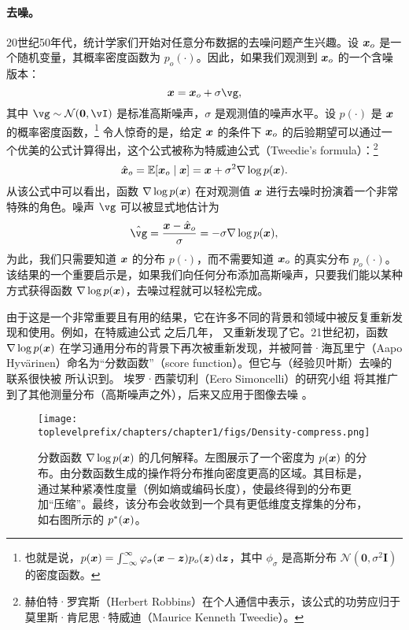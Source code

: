 \documentclass[../../book-main.tex]{subfiles}
\begin{document}
\paragraph{去噪。}
20世纪50年代，统计学家们开始对任意分布数据的去噪问题产生兴趣。设 $\bm{x}_o$ 是一个随机变量，其概率密度函数为 $p_o(\cdot)$。因此，如果我们观测到 $\bm{x}_o$ 的一个含噪版本：
\begin{equation}
    \x = \x_o + \sigma \vg, 
\end{equation}
其中 $\vg \sim \dNorm(\vzero, \vI)$ 是标准高斯噪声，$\sigma$ 是观测值的噪声水平。设 $p(\cdot)$ 是 $\bm{x}$ 的概率密度函数，\footnote{也就是说，$p(\x) = \int_{-\infty}^{\infty} \phi_{\sigma}(\x - \z)p_o(\z) \odif{\z}$，其中 $\phi_{\sigma}$ 是高斯分布 $\mathcal{N}(\boldsymbol{0}, \sigma^2 \boldsymbol{I})$ 的密度函数。} 令人惊奇的是，给定 $\bm{x}$ 的条件下 $\bm{x}_o$ 的后验期望可以通过一个优美的公式计算得出，这个公式被称为特威迪公式（Tweedie's formula）\cite{Robbins1956AnEB}：\footnote{赫伯特·罗宾斯（Herbert Robbins）在个人通信中表示，该公式的功劳应归于莫里斯·肯尼思·特威迪（Maurice Kenneth Tweedie）。}
\begin{equation}
    \hat {\bm{x}}_o = \mathbb{E}[\bm{x}_o\mid \bm{x}] = \bm{x} + \sigma^2 \nabla \log p(\bm{x}).
\end{equation}
从该公式中可以看出，函数 $\nabla \log p(\bm{x})$ 在对观测值 $\bm{x}$ 进行去噪时扮演着一个非常特殊的角色。噪声 $\vg$ 可以被显式地估计为
\begin{equation}
    \hat{\vg} = \frac{\x - \hat \x_o}{\sigma} = -\sigma \nabla \log p(\x),
\end{equation}
为此，我们只需要知道 $\bm{x}$ 的分布 $p(\cdot)$，而不需要知道 $\bm{x}_o$ 的真实分布 $p_o(\cdot)$。该结果的一个重要启示是，如果我们向任何分布添加高斯噪声，只要我们能以某种方式获得函数 $\nabla \log p(\bm{x})$，去噪过程就可以轻松完成。

由于这是一个非常重要且有用的结果，它在许多不同的背景和领域中被反复重新发现和使用。例如，在特威迪公式 \cite{Robbins1956AnEB} 之后几年，\cite{Miyasawa61} 又重新发现了它。21世纪初，函数 $\nabla \log p(\bm{x})$ 在学习通用分布的背景下再次被重新发现，并被阿普·海瓦里宁（Aapo Hyv\"{a}rinen）命名为“分数函数”（score function）\cite{hyvarinen05a}。但它与（经验贝叶斯）去噪的联系很快被 \cite{Vincent2011} 所认识到。
埃罗·西蒙切利（Eero Simoncelli）的研究小组 \cite{Raphan10} 将其推广到了其他测量分布（高斯噪声之外），后来又应用于图像去噪 \cite{Kadkhodaie21a,ho2020denoising}。

\begin{figure}
    \centering
    \texttt{[image: \\toplevelprefix/chapters/chapter1/figs/Density-compress.png]}
    \caption{分数函数 $\nabla \log p(\bm{x})$ 的几何解释。左图展示了一个密度为 $p(\bm{x})$ 的分布。由分数函数生成的操作将分布推向密度更高的区域。其目标是，通过某种紧凑性度量（例如熵或编码长度），使最终得到的分布更加“压缩”。最终，该分布会收敛到一个具有更低维度支撑集的分布，如右图所示的 $p^*(\bm{x})$。}
    \label{fig:score-function}
\end{figure}
\end{document}
